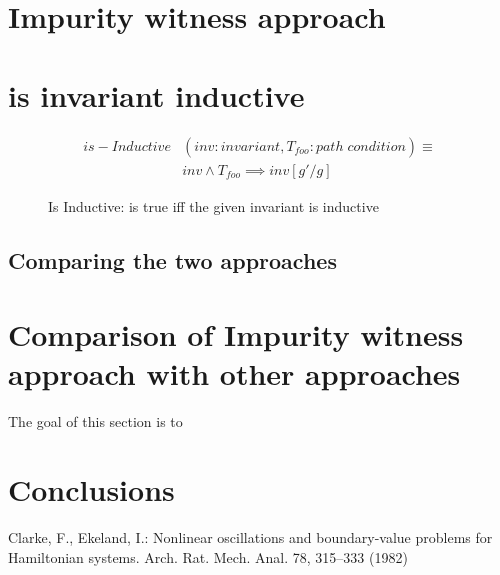 \documentclass{llncs}
\newcommand{\foo}{\textit{foo}}
\newcommand{\inv}{\mathit{inv}}
\newcommand{\pathCondition}{\mathit{T_{\foo}}}
\newcommand{\mi}[1]{\mathit{#1}}
\newcommand{\g}{\mathit{g}}
\begin{document}
\section{Impurity witness approach}
\section{is invariant inductive}

\begin{figure}[htp]
  \begin{algorithm}[H]
    \begin{align*}
      is-Inductive & \mi{(\inv :
        invariant, \pathCondition : path \; condition)} \equiv \\
      &\inv \wedge \pathCondition \implies \inv[\g'/\g]
    \end{align*}
    \caption{Is Inductive: is true iff the given invariant is inductive} 
    \label{algo:someOPcheckCombined}
  \end{algorithm}  
\end{figure}

\subsection{Comparing the two approaches}
\section{Comparison of Impurity witness approach with other approaches}
The goal of this section is to 

\section{Conclusions}
%

%
%
\begin{thebibliography}{5}
%
Clarke, F., Ekeland, I.:
Nonlinear oscillations and
boundary-value problems for Hamiltonian systems.
Arch. Rat. Mech. Anal. 78, 315--333 (1982)


\end{thebibliography}
\end{document}
